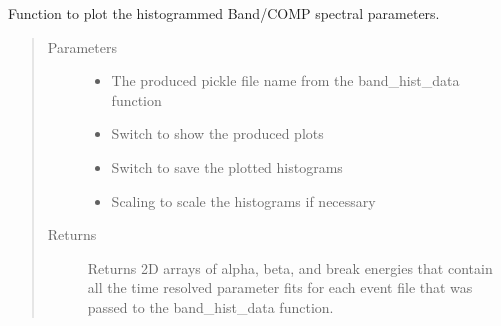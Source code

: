 \documentclass[letterpaper,10pt,english]{sphinxmanual}
\begin{document}
\begin{fulllineitems}
\label{\detokenize{read_process_files:read_process_files.band_hist_plot}}
Function to plot the histogrammed Band/COMP spectral parameters.
\begin{quote}\begin{description}
\item[{Parameters}] \leavevmode\begin{itemize}
\item {} 
 \textendash{} The produced pickle file name from the band\_hist\_data function

\item {} 
 \textendash{} Switch to show the produced plots

\item {} 
 \textendash{} Switch to save the plotted histograms

\item {} 
 \textendash{} Scaling to scale the histograms if necessary

\end{itemize}

\item[{Returns}] \leavevmode
Returns 2D arrays of alpha, beta, and break energies that contain all the time resolved parameter fits for
each event file that was passed to the band\_hist\_data function.

\end{description}\end{quote}

\end{fulllineitems}

\end{document}
